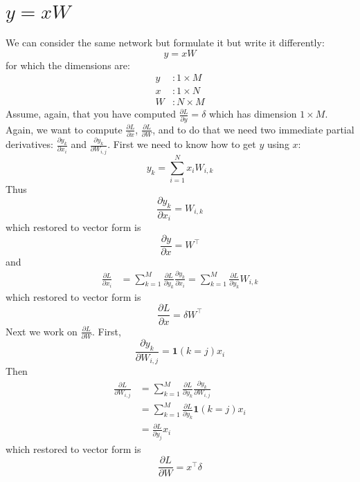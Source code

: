 \documentclass{article}
\begin{document}
\section{$y = xW$}
We can consider the same network but formulate it but write it differently:
\begin{equation}
    y = xW
\end{equation}
for which the dimensions are:
\begin{align}
    y &: 1 \times M \\
    x &: 1 \times N \\
    W &: N \times M
\end{align}
Assume, again, that you have computed $\frac{\partial L}{\partial y} = \delta$ which has dimension $1\times M$. Again, we want to compute $\frac{\partial L}{\partial x}$, $\frac{\partial L}{\partial W}$, and to do that we need two immediate partial derivatives: $\frac{\partial y_k}{\partial x_i}$ and $\frac{\partial y_k}{\partial W_{i, j}}$. First we need to know how to get $y$ using $x$:
\begin{equation}
    y_k = \sum_{i = 1}^N x_iW_{i, k}
\end{equation}
Thus 
\begin{equation}
    \frac{\partial y_k}{\partial x_i} = W_{i, k} 
\end{equation}
which restored to vector form is
\begin{equation}
    \frac{\partial y}{\partial x} = W^\top
\end{equation}
and
\begin{align}
   \frac{\partial L}{\partial x_i} 
   &= \sum_{k=1}^M\frac{\partial L}{\partial y_k}\frac{\partial y_k}{\partial x_i} = \sum_{k=1}^M\frac{\partial L}{\partial y_k}W_{i, k} 
\end{align}
which restored to vector form is
\begin{equation}
    \frac{\partial L}{\partial x} = \delta W^\top
\end{equation}
Next we work on $\frac{\partial L}{\partial W}$. First, 
\begin{equation}
    \frac{\partial y_k}{\partial W_{i, j}} = \mathbf{1}(k=j)x_i
\end{equation}
Then
\begin{align}
    \frac{\partial L}{\partial W_{i, j}} 
    &= \sum_{k=1}^M\frac{\partial L}{\partial y_k}\frac{\partial y_k}{\partial W_{i, j}} \\ 
    &= \sum_{k=1}^M\frac{\partial L}{\partial y_k}\mathbf{1}(k=j)x_i \\
    &= \frac{\partial L}{\partial y_j}x_i
\end{align}
which restored to vector form is
\begin{equation}
    \frac{\partial L}{\partial W} = x^\top\delta
\end{equation}
\end{document}
